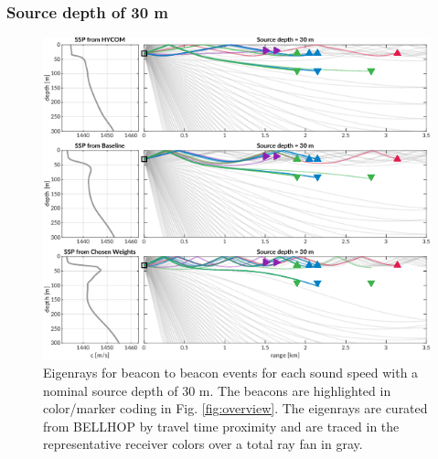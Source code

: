 \subsubsection{Source depth of 30 m}
\begin{figure}[h!]
  \centering
  \includegraphics[width=\reprintcolumnwidth]{figs/Fig4.pdf}
  \caption{Eigenrays for beacon to beacon events for each sound speed with a nominal source depth of 30 m. The beacons are highlighted in color/marker coding in Fig. \ref{fig:overview}. The eigenrays are curated from BELLHOP by travel time proximity and are traced in the representative receiver colors over a total ray fan in gray.}
  \label{fig:raytrace-zs30}
\end{figure}

